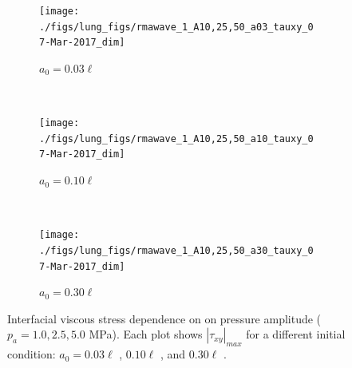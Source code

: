 % 
\begin{figure}
  \centering
  \begin{subfigure}[b]{0.49\textwidth}
    \texttt{[image: ./figs/lung\_figs/rmawave\_1\_A10,25,50\_a03\_tauxy\_07-Mar-2017\_dim]}
    \caption{\label{fig:stress_multi-pa_a03} $a_0 = 0.03\ell$}
  \end{subfigure}
  ~ 
  \begin{subfigure}[b]{0.49\textwidth}
    \texttt{[image: ./figs/lung\_figs/rmawave\_1\_A10,25,50\_a10\_tauxy\_07-Mar-2017\_dim]}
    \caption{\label{fig:stress_multi-pa_a10} $a_0 = 0.10\ell$}
  \end{subfigure}
  ~ 
  \begin{subfigure}[b]{0.49\textwidth}
    \texttt{[image: ./figs/lung\_figs/rmawave\_1\_A10,25,50\_a30\_tauxy\_07-Mar-2017\_dim]}
    \caption{\label{fig:stress_multi-pa_a30} $a_0 = 0.30\ell$}
  \end{subfigure}
  \caption[Interfacial viscous stress dependence on pressure
  amplitude ($p_a=1.0, 2.5, 5.0$ MPa)]{Interfacial viscous stress
    dependence on on pressure amplitude ($p_a=1.0, 2.5, 5.0$ MPa). Each
    plot shows $\left|\tau_{xy}\right|_{max}$ for a different initial
    condition: $a_0=0.03\ell$ ,
    $0.10\ell$ , and $0.30\ell$
    .}
  \label{fig:pa_dependence_stress}
\end{figure}
% 
